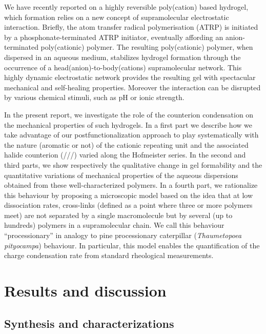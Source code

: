 \documentclass[twoside,twocolumn,9pt]{article}
\begin{document}
We have recently reported on a highly reversible poly(cation) based hydrogel\cite{Srour2014}, which formation relies on a new concept of supramolecular  electrostatic interaction. Briefly, the atom transfer radical polymerisation (ATRP) is initiated by a phosphonate-terminated ATRP initiator, eventually affording an anion-terminated poly(cationic) polymer. The resulting poly(cationic) polymer, when dispersed in an aqueous medium, stabilizes hydrogel formation through the occurrence of a head(anion)-to-body(cations) supramolecular network. This highly dynamic electrostatic network provides the resulting gel with spectacular mechanical and self-healing properties. Moreover the interaction can be disrupted by various chemical stimuli, such as pH or ionic strength.

In the present report, we investigate the role of the counterion condensation on the mechanical properties of such hydrogels. In a first part we describe how we take advantage of our postfunctionalization approach to play systematically with the nature (aromatic or not) of the cationic repeating unit and the associated halide counterion (///) varied along the Hofmeister series. In the second and third parts, we show respectively the qualitative change in gel formability and the quantitative variations of mechanical properties of the aqueous dispersions obtained from these well-characterized polymers. In a fourth part, we rationalize this behaviour by proposing a microscopic model based on the idea that at low dissociation rates, cross-links (defined as a point where three or more polymers meet) are not separated by a single macromolecule but by several (up to hundreds) polymers in a supramolecular chain. We call this behaviour ``processionary'' in analogy to pine processionary caterpillar (\textit{Thaumetopoea pityocampa}) behaviour\cite{Fabre1916}. In particular, this model enables the quantification of the charge condensation rate from standard rheological measurements.%


\section{Results and discussion}

\subsection{Synthesis and characterizations}
\end{document}
